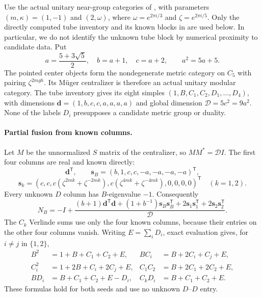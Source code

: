 Use the actual unitary near-group categories of
\cite[Proposition~6 and Table~2]{EGNearGroup}, with parameters
$(m,\kappa)=(1,-1)$ and $(2,\omega)$, where
$\omega=e^{2\pi i/3}$ and $\zeta=e^{2\pi i/5}$.
Only the directly computed tube inventory and its known blocks in
\cite[Section~4.3]{EGNearGroup} are used below. In particular, we do not
identify the unknown tube block by numerical proximity to candidate data.
Put
\[
 a=\frac{5+3\sqrt5}{2},\quad b=a+1,\quad c=a+2,
 \qquad a^2=5a+5.
\]
The pointed center objects form the nondegenerate metric category on $C_5$
with pairing $\zeta^{2mgh}$. Its M\"uger centralizer is therefore an actual
unitary modular category. The tube inventory gives its eight simples
$(1,B,C_1,C_2,D_1,\ldots,D_4)$, with dimensions
$\mathbf d=(1,b,c,c,a,a,a,a)$ and global dimension
$\mathcal D=5c^2=9a^2$. None of the labels $D_i$ presupposes a candidate
metric group or duality.

\paragraph{Partial fusion from known columns.}
Let $M$ be the unnormalized $S$ matrix of the centralizer, so
$MM^*=\mathcal D I$. The first four columns are real and known directly:
\[
 \mathbf d^{\mathsf T},\qquad
 \mathbf s_B=(b,1,c,c,-a,-a,-a,-a)^{\mathsf T},
\]
\[
 \mathbf s_k=(c,c,c(\zeta^{2mk}+\zeta^{-2mk}),
 c(\zeta^{4mk}+\zeta^{-4mk}),0,0,0,0)^{\mathsf T}
 \quad(k=1,2).
\]
Every unknown $D$ column has $B$-eigenvalue $-1$. Consequently
\[
 N_B=-I+\frac{(b+1)\mathbf d^{\mathsf T}\mathbf d+
 (1+b^{-1})\mathbf s_B\mathbf s_B^{\mathsf T}
 +2\mathbf s_1\mathbf s_1^{\mathsf T}
 +2\mathbf s_2\mathbf s_2^{\mathsf T}}{\mathcal D}.
\]
The $C_k$ Verlinde sums use only the four known columns, because their
entries on the other four columns vanish. Writing $E=\sum_iD_i$, exact
evaluation gives, for $i\ne j$ in $\{1,2\}$,
\begin{align*}
 B^2&=1+B+C_1+C_2+E,& BC_i&=B+2C_i+C_j+E,\\
 C_i^2&=1+2B+C_i+2C_j+E,& C_1C_2&=B+2C_1+2C_2+E,\\
 BD_i&=B+C_1+C_2+E-D_i,& C_kD_i&=B+C_1+C_2+E.
\end{align*}
These formulas hold for both seeds and use no unknown $D$--$D$ entry.

